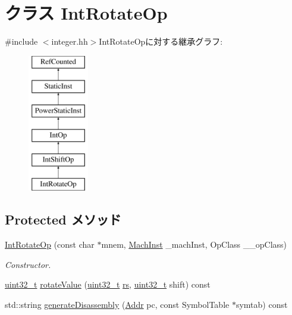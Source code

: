 \hypertarget{classPowerISA_1_1IntRotateOp}{
\section{クラス IntRotateOp}
\label{classPowerISA_1_1IntRotateOp}
}


{\ttfamily \#include $<$integer.hh$>$}IntRotateOpに対する継承グラフ:\begin{figure}[H]
\begin{center}
\leavevmode
\includegraphics[height=6cm]{classPowerISA_1_1IntRotateOp}
\end{center}
\end{figure}
\subsection*{Protected メソッド}
\begin{DoxyCompactItemize}
\item 
\hyperlink{classPowerISA_1_1IntRotateOp_a77085b4707de2530c85e43f9804322aa}{IntRotateOp} (const char $\ast$mnem, \hyperlink{namespacePowerISA_a301c22ea09fa33dcfe6ddf22f203699c}{MachInst} \_\-machInst, OpClass \_\-\_\-opClass)
\begin{DoxyCompactList}\small\item\em Constructor. \item\end{DoxyCompactList}\item 
\hyperlink{Type_8hh_a435d1572bf3f880d55459d9805097f62}{uint32\_\-t} \hyperlink{classPowerISA_1_1IntRotateOp_a8b02df46b78e18d8a65efa679399d5ea}{rotateValue} (\hyperlink{Type_8hh_a435d1572bf3f880d55459d9805097f62}{uint32\_\-t} \hyperlink{namespacePowerISA_ab6ffbb9e1859687ca71ea09405ea7e77}{rs}, \hyperlink{Type_8hh_a435d1572bf3f880d55459d9805097f62}{uint32\_\-t} shift) const 
\item 
std::string \hyperlink{classPowerISA_1_1IntRotateOp_a3134956ec18bb095818e06eb988f6c55}{generateDisassembly} (\hyperlink{base_2types_8hh_af1bb03d6a4ee096394a6749f0a169232}{Addr} pc, const SymbolTable $\ast$symtab) const 
\end{DoxyCompactItemize}
